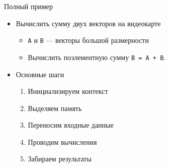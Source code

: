 \documentclass[@BEAMER_OPTIONS@]{beamer}
\newcommand{\code}[1]{\lstinline|#1|}
\begin{document}
\begin{frame}{Полный пример}
    \begin{itemize}
        \item Вычислить сумму двух векторов на видеокарте
            \begin{itemize}
                \item \code{A} и \code{B} --- векторы большой размерности
                \item Вычислить поэлементную сумму \code{B = A + B}.
            \end{itemize}
            \vspace{\baselineskip}
        \item Основные шаги
            \begin{enumerate}
                \item Инициализируем контекст
                \item Выделяем память
                \item Переносим входные данные
                \item Проводим вычисления
                \item Забираем результаты
            \end{enumerate}
    \end{itemize}
\end{frame}
\end{document}
